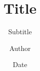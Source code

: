 \documentclass[169, pdf]{beamer}
\title{Title}
\subtitle{Subtitle}
\author{Author}
\date{Date}
\institute[short name]{Full name}
\begin{document}
\frame{\titlepage}
\end{document}
